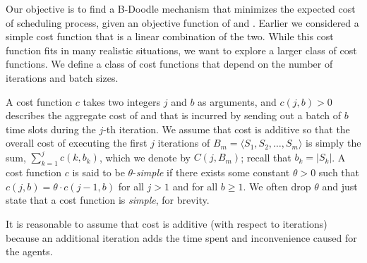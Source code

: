 Our objective is to find a B-Doodle mechanism that minimizes the expected cost of scheduling process, given an objective function of \Times and \Inconvenience.  Earlier we considered a simple cost function that is a linear combination of the two.  While this cost function fits in many realistic situations, we want to explore a larger class of cost functions. We define a class of cost functions that depend on the number of iterations and batch sizes.
\begin{definition} \label{bdoodle:def:cost-function}
A cost function $c$ takes two integers $j$ and $b$ as arguments, and $c(j, b) > 0$ describes the aggregate cost of \Times and \Inconveniences that is incurred by sending out a batch of $b$ time slots during the $j$-th iteration. We assume that cost is additive so that the overall cost of executing the first $j$ iterations of ${B}_m = \langle S_1, S_2, \dots, S_m \rangle$ is simply the sum, $\sum_{k=1}^{j} c(k, b_k)$, which we denote by $C(j, {B}_m)$; recall that $b_k = |S_k|$. 
A cost function $c$ is said to be $\theta$-\emph{simple} if there exists some constant $\theta>0$ such that $c(j, b) = \theta \cdot c(j-1, b)$ for all $j > 1$ and for all $b \geq 1$. We often drop $\theta$ and just state that a cost function is \emph{simple}, for brevity.
\end{definition}
It is reasonable to assume that cost is additive (with respect to iterations) because an additional iteration adds the time spent and inconvenience caused for the agents.

